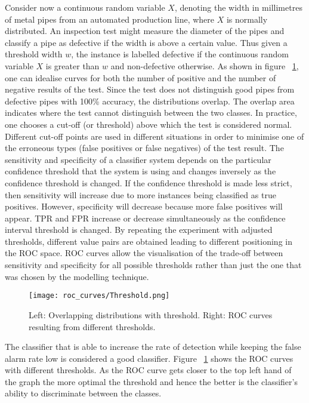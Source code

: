 Consider now a continuous random variable $X$, denoting the width in millimetres of metal pipes from an automated production line, where $X$ is normally distributed. An inspection test might measure the diameter of the pipes and classify a pipe as defective if the width is above a certain value. Thus given a threshold width $w$, the instance is labelled defective if the continuous random variable $X$ is greater than $w$ and non-defective otherwise. As shown in figure ~\ref{fig:roc-curves}, one can idealise curves for both the number of positive and the number of negative results of the test. Since the test does not distinguish good pipes from defective pipes with 100\% accuracy, the distributions overlap. The overlap area indicates where the test cannot distinguish between the two classes. In practice, one chooses a cut-off (or threshold) above which the test is considered normal. Different cut-off points are used in different situations in order to minimise one of the erroneous types (false positives or false negatives) of the test result. The sensitivity and specificity of a classifier system depends on the particular confidence threshold that the system is using and changes inversely as the confidence threshold is changed. If the confidence threshold is made less strict, then sensitivity will increase due to more instances being classified as true positives. However, specificity will decrease because more false positives will appear. TPR and FPR increase or decrease simultaneously as the confidence interval threshold is changed. By repeating the experiment with adjusted thresholds, different value pairs are obtained leading to different positioning in the ROC space. ROC curves allow the visualisation of the trade-off between sensitivity and specificity for all possible thresholds rather than just the one that was chosen by the modelling technique.

\begin{figure}
	\texttt{[image: roc\_curves/Threshold.png]}
	\caption{Left: Overlapping distributions with threshold. Right: ROC curves resulting from different thresholds.}
	\label{fig:roc-curves}
\end{figure}

The classifier that is able to increase the rate of detection while keeping the false alarm rate low is considered a good classifier. Figure ~\ref{fig:roc-curves} shows the ROC curves with different thresholds. As the ROC curve gets closer to the top left hand of the graph the more optimal the threshold and hence the better is the classifier's ability to discriminate between the classes.

